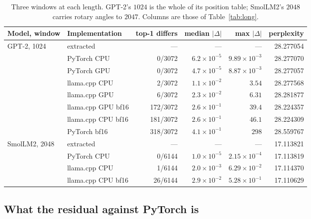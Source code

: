 \documentclass[11pt]{article}
\theoremstyle{plain}
\theoremstyle{definition}
\begin{document}
\begin{table}[t]
\centering
\footnotesize
\begin{tabular}{llrrrr}
\toprule
\textbf{Model, window} & \textbf{Implementation} & \textbf{top-1 differs}
  & \textbf{median} $|\Delta|$ & \textbf{max} $|\Delta|$ & \textbf{perplexity} \\
\midrule
GPT-2, 1024   & extracted          & ---      & ---                & ---                 & 28.277054 \\
              & PyTorch CPU        & 0/3072   & $6.2\times10^{-5}$ & $9.89\times10^{-3}$ & 28.277070 \\
              & PyTorch GPU        & 0/3072   & $4.7\times10^{-5}$ & $8.87\times10^{-3}$ & 28.277057 \\
              & llama.cpp CPU      & 2/3072   & $1.1\times10^{-2}$ & $3.54$              & 28.277568 \\
              & llama.cpp GPU      & 6/3072   & $2.3\times10^{-2}$ & $6.31$              & 28.281877 \\
              & llama.cpp GPU bf16 & 172/3072 & $2.6\times10^{-1}$ & $39.4$              & 28.224357 \\
              & llama.cpp CPU bf16 & 181/3072 & $2.6\times10^{-1}$ & $46.1$              & 28.224309 \\
              & PyTorch bf16       & 318/3072 & $4.1\times10^{-1}$ & $298$               & 28.559767 \\
\midrule
SmolLM2, 2048 & extracted          & ---      & ---                & ---                 & 17.113821 \\
              & PyTorch CPU        & 0/6144   & $1.0\times10^{-5}$ & $2.15\times10^{-4}$ & 17.113819 \\
              & llama.cpp CPU      & 1/6144   & $2.0\times10^{-3}$ & $6.29\times10^{-2}$ & 17.114370 \\
              & llama.cpp CPU bf16 & 26/6144  & $2.9\times10^{-2}$ & $5.28\times10^{-1}$ & 17.110629 \\
\bottomrule
\end{tabular}
\caption{Three windows at each length. GPT-2's $1024$ is the whole of its
position table; SmolLM2's $2048$ carries rotary angles to $2047$. Columns are
those of Table~\ref{tab:long}.}
\label{tab:longctx}
\end{table}

\subsection{What the residual against PyTorch is}
\end{document}
